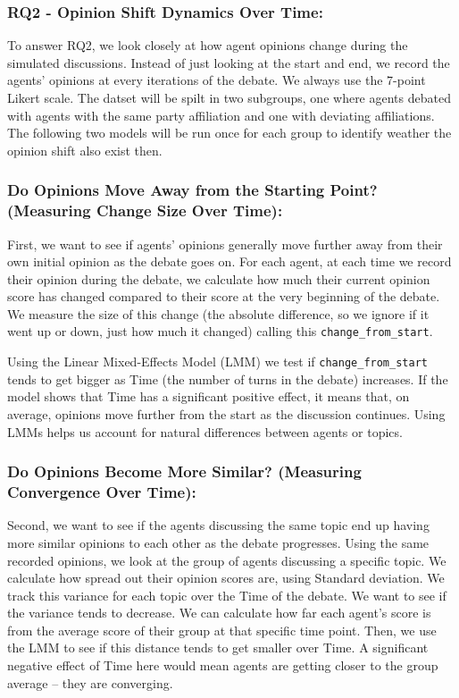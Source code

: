 \documentclass[12pt]{article}
\begin{document}
\begin{multicols}{2}
\subsubsection{RQ2 - Opinion Shift Dynamics Over Time:}
\label{subsubsex:RQ2}

To answer RQ2, we look closely at how agent opinions change during the simulated discussions. Instead of just looking at the start and end, we record the agents' opinions at every iterations of the debate. We always use the 7-point Likert scale. The datset will be spilt in two subgroups, one where agents debated with agents with the same party affiliation and one with deviating affiliations. The following two models will be run once for each group to identify weather the opinion shift also exist then.


\subsubsection{Do Opinions Move Away from the Starting Point? (Measuring Change Size Over Time):}
First, we want to see if agents' opinions generally move further away from their own initial opinion as the debate goes on. For each agent, at each time we record their opinion during the debate, we calculate how much their current opinion score has changed compared to their score at the very beginning of the debate. We measure the size of this change (the absolute difference, so we ignore if it went up or down, just how much it changed) calling this \texttt{change\_from\_start}.


Using the Linear Mixed-Effects Model (LMM) we test if \texttt{change\_from\_start} tends to get bigger as Time (the number of turns in the debate) increases. If the model shows that Time has a significant positive effect, it means that, on average, opinions move further from the start as the discussion continues. Using LMMs helps us account for natural differences between agents or topics. 

\subsubsection{Do Opinions Become More Similar? (Measuring Convergence Over Time):}

Second, we want to see if the agents discussing the same topic end up having more similar opinions to each other as the debate progresses. Using the same recorded opinions, we look at the group of agents discussing a specific topic. We calculate how spread out their opinion scores are, using Standard deviation. We track this variance for each topic over the Time of the debate. We want to see if the variance tends to decrease. We can calculate how far each agent's score is from the average score of their group at that specific time point. Then, we use the LMM to see if this distance tends to get smaller over Time. A significant negative effect of Time here would mean agents are getting closer to the group average – they are converging.


\end{multicols}
\end{document}
